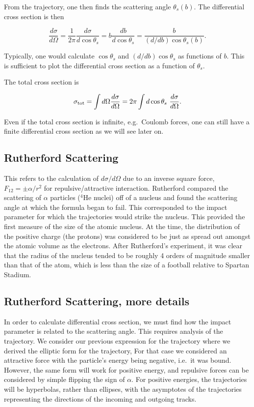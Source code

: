 \documentclass[%
oneside,                 %
final,                   %
10pt]{article}
\begin{document}
From the trajectory, one then finds the scattering angle
$\theta_s(b)$. The differential cross section is then

\begin{equation}
\frac{d\sigma}{d\Omega}=\frac{1}{2\pi}\frac{d\sigma}{d\cos\theta_s}=b\frac{db}{d\cos\theta_s}=\frac{b}{(d/db)\cos\theta_s(b)}.
\end{equation}

Typically, one would calculate $\cos\theta_s$ and $(d/db)\cos\theta_s$
as functions of $b$. This is sufficient to plot the differential cross
section as a function of $\theta_s$.

The total cross section is 

\begin{equation}
\sigma_{\rm tot}=\int d\Omega\frac{d\sigma}{d\Omega}=2\pi\int d\cos\theta_s~\frac{d\sigma}{d\Omega}. 
\end{equation}

Even if the total cross section is infinite, e.g.~Coulomb forces, one
can still have a finite differential cross section as we will see
later on.

\subsection{Rutherford Scattering}

This refers to the calculation of $d\sigma/d\Omega$ due to an inverse
square force, $F_{12}=\pm\alpha/r^2$ for repulsive/attractive
interaction. Rutherford compared the scattering of $\alpha$ particles
($^4$He nuclei) off of a nucleus and found the scattering angle at
which the formula began to fail. This corresponded to the impact
parameter for which the trajectories would strike the nucleus. This
provided the first measure of the size of the atomic nucleus. At the
time, the distribution of the positive charge (the protons) was
considered to be just as spread out amongst the atomic volume as the
electrons. After Rutherford's experiment, it was clear that the radius
of the nucleus tended to be roughly 4 orders of magnitude smaller than
that of the atom, which is less than the size of a football relative
to Spartan Stadium.

\subsection{Rutherford Scattering, more details}

In order to calculate differential cross section, we must find how the
impact parameter is related to the scattering angle. This requires
analysis of the trajectory. We consider our previous expression for
the trajectory where we derived the elliptic form for the trajectory,
For that case we considered an attractive
force with the particle's energy being negative, i.e.~it was
bound. However, the same form will work for positive energy, and
repulsive forces can be considered by simple flipping the sign of
$\alpha$. For positive energies, the trajectories will be hyperbolas,
rather than ellipses, with the asymptotes of the trajectories
representing the directions of the incoming and outgoing
tracks.
\end{document}
